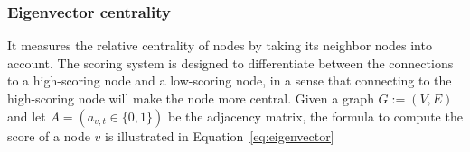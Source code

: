 


\subsubsection{Eigenvector centrality}
%
It measures the relative centrality of nodes by taking its neighbor nodes into
account. The scoring system is designed to differentiate between the
connections to a high-scoring node and a low-scoring node, in a sense that
connecting to the high-scoring node will make the node more central. Given a
graph $G:=(V,E)$ and let $A = (a_{v,t}\in\{0, 1\})$ be the adjacency matrix,
the formula to compute the score of a node $v$ is illustrated in
Equation~\eqref{eq:eigenvector}

